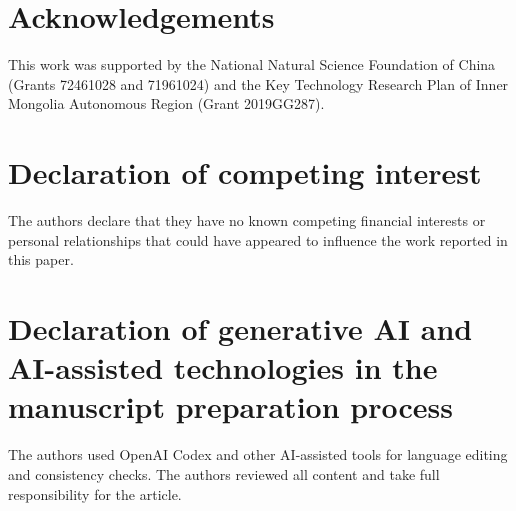 \documentclass[preprint,12pt]{elsarticle}
\begin{document}
\section*{Acknowledgements}
This work was supported by the National Natural Science Foundation of China (Grants 72461028 and 71961024) and the Key Technology Research Plan of Inner Mongolia Autonomous Region (Grant 2019GG287).

\section*{Declaration of competing interest}
The authors declare that they have no known competing financial interests or personal relationships that could have appeared to influence the work reported in this paper.

\section*{Declaration of generative AI and AI-assisted technologies in the manuscript preparation process}
The authors used OpenAI Codex and other AI-assisted tools for language editing and consistency checks. The authors reviewed all content and take full responsibility for the article.
\fi



\end{document}

